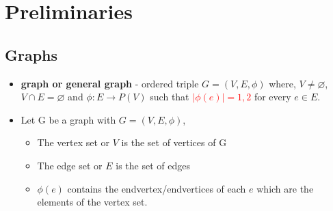 \section{Preliminaries}
\subsection{Graphs}
\begin{itemize}
 \item \textbf{graph or general graph} - ordered triple $G=(V,E,\phi)$ where, $V\neq\varnothing$, $V \cap E = \varnothing$ and $\phi:E \rightarrow P(V)$ such that \textcolor{red}{$|\phi(e)|={1,2}$} for every $e \in E$.
 \item Let G be a graph with $G = (V,E,\phi)$,
	\begin{itemize}
		\item The vertex set or $V$ is the set of vertices of G
		\item The edge set or $E$ is the set of edges
		\item $\phi(e)$ contains the endvertex/endvertices of each $e$ which are the elements of the vertex set. 
	\end{itemize}	 
\begin{figure}[h!]
\centering
{}
\end{figure}
\end{itemize}
